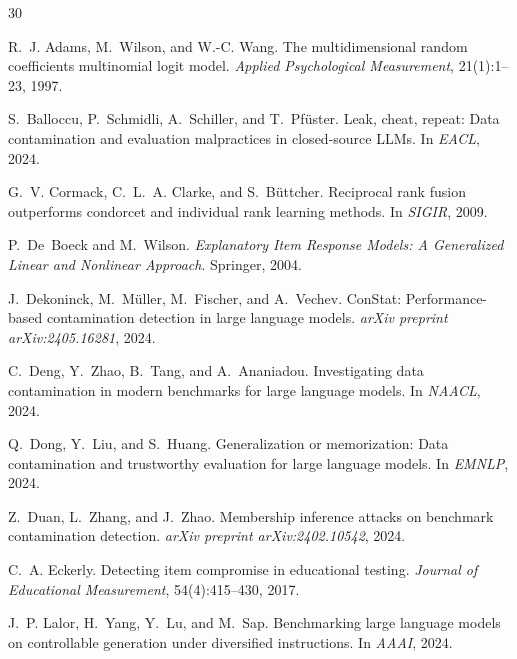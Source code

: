 \documentclass[letterpaper]{article}
\begin{document}
\begin{thebibliography}{30}

R.~J. Adams, M.~Wilson, and W.-C. Wang.
\newblock The multidimensional random coefficients multinomial logit model.
\newblock \emph{Applied Psychological Measurement}, 21(1):1--23, 1997.

S.~Balloccu, P.~Schmidli, A.~Schiller, and T.~Pf\"uster.
\newblock Leak, cheat, repeat: Data contamination and evaluation malpractices in closed-source {LLMs}.
\newblock In \emph{EACL}, 2024.

G.~V. Cormack, C.~L.~A. Clarke, and S.~B\"uttcher.
\newblock Reciprocal rank fusion outperforms condorcet and individual rank learning methods.
\newblock In \emph{SIGIR}, 2009.

P.~De~Boeck and M.~Wilson.
\newblock \emph{Explanatory Item Response Models: A Generalized Linear and Nonlinear Approach}.
\newblock Springer, 2004.

J.~Dekoninck, M.~Müller, M.~Fischer, and A.~Vechev.
\newblock Con{S}tat: Performance-based contamination detection in large language models.
\newblock \emph{arXiv preprint arXiv:2405.16281}, 2024.

C.~Deng, Y.~Zhao, B.~Tang, and A.~Ananiadou.
\newblock Investigating data contamination in modern benchmarks for large language models.
\newblock In \emph{NAACL}, 2024.

Q.~Dong, Y.~Liu, and S.~Huang.
\newblock Generalization or memorization: Data contamination and trustworthy evaluation for large language models.
\newblock In \emph{EMNLP}, 2024.

Z.~Duan, L.~Zhang, and J.~Zhao.
\newblock Membership inference attacks on benchmark contamination detection.
\newblock \emph{arXiv preprint arXiv:2402.10542}, 2024.

C.~A. Eckerly.
\newblock Detecting item compromise in educational testing.
\newblock \emph{Journal of Educational Measurement}, 54(4):415--430, 2017.

J.~P. Lalor, H.~Yang, Y.~Lu, and M.~Sap.
\newblock Benchmarking large language models on controllable generation under diversified instructions.
\newblock In \emph{AAAI}, 2024.


\end{thebibliography}
\end{document}
